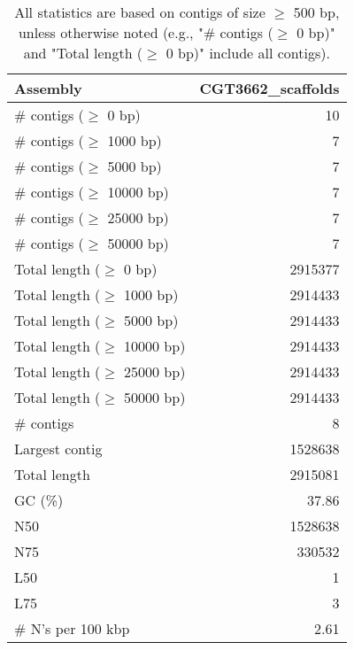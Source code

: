 \documentclass[12pt,a4paper]{article}
\begin{document}
\begin{table}[ht]
\begin{center}
\caption{All statistics are based on contigs of size $\geq$ 500 bp, unless otherwise noted (e.g., "\# contigs ($\geq$ 0 bp)" and "Total length ($\geq$ 0 bp)" include all contigs).}
\begin{tabular}{|l*{1}{|r}|}
\hline
Assembly & CGT3662\_scaffolds \\ \hline
\# contigs ($\geq$ 0 bp) & 10 \\ \hline
\# contigs ($\geq$ 1000 bp) & 7 \\ \hline
\# contigs ($\geq$ 5000 bp) & 7 \\ \hline
\# contigs ($\geq$ 10000 bp) & 7 \\ \hline
\# contigs ($\geq$ 25000 bp) & 7 \\ \hline
\# contigs ($\geq$ 50000 bp) & 7 \\ \hline
Total length ($\geq$ 0 bp) & 2915377 \\ \hline
Total length ($\geq$ 1000 bp) & 2914433 \\ \hline
Total length ($\geq$ 5000 bp) & 2914433 \\ \hline
Total length ($\geq$ 10000 bp) & 2914433 \\ \hline
Total length ($\geq$ 25000 bp) & 2914433 \\ \hline
Total length ($\geq$ 50000 bp) & 2914433 \\ \hline
\# contigs & 8 \\ \hline
Largest contig & 1528638 \\ \hline
Total length & 2915081 \\ \hline
GC (\%) & 37.86 \\ \hline
N50 & 1528638 \\ \hline
N75 & 330532 \\ \hline
L50 & 1 \\ \hline
L75 & 3 \\ \hline
\# N's per 100 kbp & 2.61 \\ \hline
\end{tabular}
\end{center}
\end{table}
\end{document}
